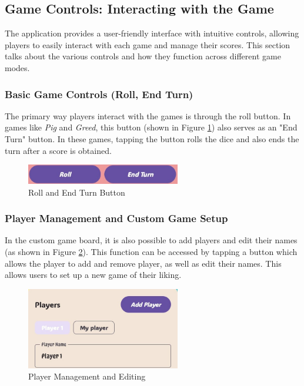 \subsection{Game Controls: Interacting with the Game}

The application provides a user-friendly interface with intuitive controls, allowing players to easily interact with each game and manage their scores. This section talks about the various controls and how they function across different game modes.

\subsubsection{Basic Game Controls (Roll, End Turn)}

The primary way players interact with the games is through the roll button. In games like \textit{Pig} and \textit{Greed}, this button (shown in Figure \ref{fig:control1}) also serves as an "End Turn" button. In these games, tapping the button rolls the dice and also ends the turn after a score is obtained.

\begin{figure}[ht!]
    \centering
    \includegraphics[width=0.6\textwidth]{img/control1.jpg}
    \caption{Roll and End Turn Button}
    \label{fig:control1}
\end{figure}

\subsubsection{Player Management and Custom Game Setup}

In the custom game board, it is also possible to add players and edit their names (as shown in Figure \ref{fig:control2}). This function can be accessed by tapping a button which allows the player to add and remove player, as well as edit their names. This allows users to set up a new game of their liking.

\begin{figure}[ht!]
    \centering
    \includegraphics[width=0.6\textwidth]{img/control2.jpg}
    \caption{Player Management and Editing}
    \label{fig:control2}
\end{figure}

